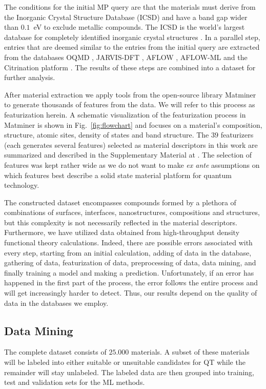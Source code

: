 \documentclass[superscriptaddress,unsortedaddress,
 amsmath,amssymb,
 aps,
]{revtex4-2}
\begin{document}
The conditions for the initial MP query are that the materials must derive from the Inorganic Crystal Structure Database (ICSD) and have a band gap wider than $0.1$~eV to exclude metallic compounds. The ICSD is the world's largest database for completely identified inorganic crystal structures \cite{Allen1987,Zagorac2019}. In a parallel step, entries that are deemed similar to the entries from the initial query are extracted from the databases OQMD  \cite{Saal2013,Kirklin2015}, JARVIS-DFT \cite{Choudhary2020}, AFLOW \cite{Curtarolo2012, Curtarolo2012a, Calderon2015}, AFLOW-ML \cite{Isayev2017} and the Citrination platform \cite{OMaraJordan2016MDIA}. The results of these steps are combined into a dataset for further analysis. 

After material extraction we apply tools from the open-source library Matminer \cite{Ward2018} to generate thousands of features from the data. We will refer to this process as featurization herein. A schematic visualization of the featurization process in Matminer is shown in  Fig.~\ref{fig:flowchart} 
and focuses on a material's composition,  structure, atomic sites, density of states and band structure. 
The $39$ featurizers (each generates several features) selected as material descriptors in this work are summarized and described in the Supplementary Material at \cite{supplementary}. The selection of features was kept rather wide as we do not want to make {\em ex ante} assumptions on which features best describe a solid state material platform for quantum technology. 

The constructed dataset encompasses compounds formed by a plethora of combinations of surfaces, interfaces, nanostructures, compositions and structures, but this complexity is not necessarily reflected in the material descriptors. 
Furthermore, we have utilized data obtained from high-throughput density functional theory calculations. Indeed, there are possible errors associated with every step, starting from an initial calculation, adding of data in the database, gathering of data, featurization of data, preprocessing of data, data mining, and finally training a model and making a prediction. Unfortunately, if an error has happened in the first part of the process, the error follows the entire process and will get increasingly harder to detect. Thus, our results depend on the quality of data in the databases we employ. 

\subsection*{Data Mining}
The complete dataset consists of $25.000$ materials. A subset of these materials will be labeled into either suitable or unsuitable candidates for QT while the remainder will stay unlabeled. The labeled data are then grouped into training, test and validation sets for the ML methods. 
\end{document}
